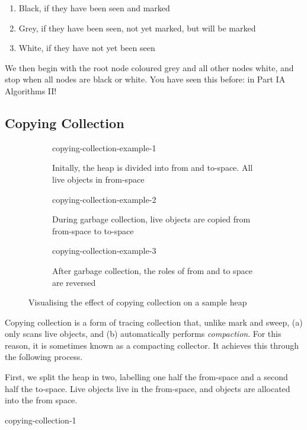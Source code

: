 \begin{enumerate}
    \item Black, if they have been seen and marked
    \item Grey, if they have been seen, not yet marked, but will be marked
    \item White, if they have not yet been seen
\end{enumerate}

We then begin with the root node coloured grey and all other nodes white, and stop when all nodes are black or white. You have seen this before: in \textsf{Part IA Algorithms II}!

\subsection{Copying Collection}
\begin{figure}[H]
    \centering
    \begin{subfigure}{0.45\textwidth}
        \centering
        {copying-collection-example-1}
        \caption{Initally, the heap is divided into from and to-space. All live objects in from-space}
    \end{subfigure}
    \begin{subfigure}{0.45\textwidth}
        \centering
        {copying-collection-example-2}
        \caption{During garbage collection, live objects are copied from from-space to to-space}
    \end{subfigure}
    \begin{subfigure}{0.45\textwidth}
        \centering
        {copying-collection-example-3}
        \caption{After garbage collection, the roles of from and to space are reversed}
    \end{subfigure}
    \caption{Visualising the effect of copying collection on a sample heap}
    \label{fig:copying-collection-example}
\end{figure}
Copying collection is a form of tracing collection that, unlike mark and sweep, (a) only scans live objects, and (b) automatically performs \textit{compaction}. For this reason, it is sometimes known as a compacting collector. It achieves this through the following process.

First, we split the heap in two, labelling one half the from-space and a second half the to-space. Live objects live in the from-space, and objects are allocated into the from space.

\begin{center}
    {copying-collection-1}
\end{center}

